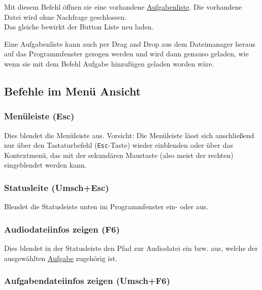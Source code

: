 \documentclass[a4paper,DIV=11
]{scrartcl}
\begin{document}
Mit diesem Befehl öffnen sie eine vorhandene
\protect\hyperlink{Aufgabenliste}{Aufgabenliste}. Die vorhandene Datei
wird ohne Nachfrage geschlossen.\\
Das gleiche bewirkt der Button Liste neu laden.

Eine Aufgabenliste kann auch per Drag and Drop aus dem Dateimanager
heraus auf das Programmfenster gezogen werden und wird dann genauso
geladen, wie wenn sie mit dem Befehl Aufgabe hinzufügen geladen worden
wäre.

\hypertarget{befehle-im-menuxfc-ansicht}{%
\subsection{Befehle im Menü Ansicht}\label{befehle-im-menuxfc-ansicht}}

\hypertarget{menuxfcleiste-esc}{%
\subsubsection{Menüleiste (Esc)}\label{menuxfcleiste-esc}}

Dies blendet die Menüleiste aus. Vorsicht: Die Menüleiste lässt sich
anschließend nur über den Tastaturbefehl (\texttt{Esc}-Taste) wieder
einblenden oder über das Kontextmenü, das mit der sekundären Maustaste
(also meist der rechten) eingeblendet werden kann.

\hypertarget{statusleite-umschesc}{%
\subsubsection{Statusleite (Umsch+Esc)}\label{statusleite-umschesc}}

Blendet die Statusleiste unten im Programmfenster ein- oder aus.

\hypertarget{audiodateiinfos-zeigen-f6}{%
\subsubsection{Audiodateiinfos zeigen
(F6)}\label{audiodateiinfos-zeigen-f6}}

Dies blendet in der Statusleiste den Pfad zur Audiodatei ein bzw. aus,
welche der ausgewählten \protect\hyperlink{aufgabendateien}{Aufgabe}
zugehörig ist.

\hypertarget{aufgabendateiinfos-zeigen-umschf6}{%
\subsubsection{Aufgabendateiinfos zeigen
(Umsch+F6)}\label{aufgabendateiinfos-zeigen-umschf6}}
\end{document}
